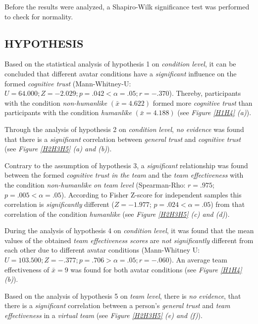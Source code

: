 \documentclass[sigchi]{acmart}
\begin{document}
Before the results were analyzed, a Shapiro-Wilk significance test was performed to check for normality.

\subsection{HYPOTHESIS}
Based on the statistical analysis of hypothesis 1 on \textit{condition level}, it can be concluded that different avatar conditions have a \textit{significant} influence on the formed \textit{cognitive trust} (Mann-Whitney-U: $U = 64.000; Z = -2.029; p =.042 < \alpha =.05; r =-.370$). Thereby, participants with the condition \textit{non-humanlike} $(\bar{x} = 4.622)$ formed more \textit{cognitive trust} than participants with the condition \textit{humanlike} $(\bar{x} = 4.188)$ (see \textit{Figure \ref{H1H4} (a)}). 

Through the analysis of hypothesis 2 on \textit{condition level}, \textit{no evidence} was found that there is a \textit{significant} correlation between \textit{general trust} and \textit{cognitive trust} (see \textit{Figure \ref{H2H3H5} (a) and (b)}). 

Contrary to the assumption of hypothesis 3, a \textit{significant} relationship was found between the formed \textit{cognitive trust in the team} and the \textit{team effectiveness} with the condition \textit{non-humanlike} \textit{on team level} (Spearman-Rho: $r =.975$; $p =.005 < \alpha = .05$). According to Fisher Z-score for independent samples \citep[p. 109]{cohen2013statistical} this correlation is \textit{significantly} different ($Z=-1.977$; $p =.024 < \alpha = .05$) from that correlation of the condition \textit{humanlike} (see \textit{Figure \ref{H2H3H5} (c) and (d)}).
 
During the analysis of hypothesis 4 on \textit{condition level}, it was found that the mean values of the obtained \textit{team effectiveness scores} are \textit{not significantly} different from each other due to different avatar conditions (Mann-Whitney U: $U = 103.500; Z = -.377; p =.706 > \alpha = .05; r = -.060$). An average team effectiveness of $\bar{x} = 9$ was found for both avatar conditions (see \textit{Figure \ref{H1H4} (b)}).

Based on the analysis of hypothesis 5 on \textit{team level}, there is \textit{no evidence}, that there is a \textit{significant} correlation between a person's \textit{general trust} and \textit{team effectiveness} in a \textit{virtual team} (see \textit{Figure \ref{H2H3H5} (e) and (f)}).
\end{document}
